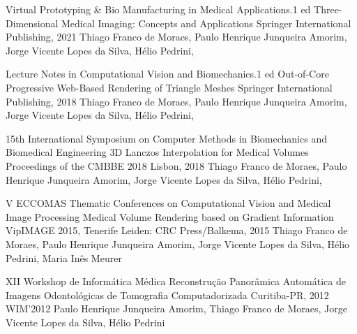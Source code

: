 \begin{cventries}
  \cventry
  {Virtual Prototyping \& Bio Manufacturing in Medical Applications.1 ed}
  {Three-Dimensional Medical Imaging: Concepts and Applications}
  {Springer International Publishing, 2021}
  {}
  {
    Thiago Franco de Moraes,
    Paulo Henrique Junqueira Amorim,
    Jorge Vicente Lopes da Silva,
    Hélio Pedrini,
  }

  \cventry
  {Lecture Notes in Computational Vision and Biomechanics.1 ed}
  {Out-of-Core Progressive Web-Based Rendering of Triangle Meshes}
  {Springer International Publishing, 2018}
  {}
  {
    Thiago Franco de Moraes,
    Paulo Henrique Junqueira Amorim,
    Jorge Vicente Lopes da Silva,
    Hélio Pedrini,
  }

  \cventry
  {15th International Symposium on Computer Methods in Biomechanics and Biomedical Engineering}
  {3D Lanczos Interpolation for Medical Volumes}
  {Proceedings of the CMBBE 2018}
  {Lisbon, 2018}
  {
    Thiago Franco de Moraes,
    Paulo Henrique Junqueira Amorim,
    Jorge Vicente Lopes da Silva,
    Hélio Pedrini,
  }

  \cventry
    {V ECCOMAS Thematic Conferences on Computational Vision and Medical Image Processing}
    {Medical Volume Rendering based on Gradient Information}
    {VipIMAGE 2015, Tenerife}
    {Leiden: CRC Press/Balkema, 2015}
    {
    Thiago Franco de Moraes,
    Paulo Henrique Junqueira Amorim,
    Jorge Vicente Lopes da Silva,
    Hélio Pedrini,
    Maria Inês Meurer
    }

   \cventry
    {XII Workshop de Informática Médica}
    {Reconstrução Panorâmica Automática de Imagens Odontológicas de Tomografia Computadorizada}
    {Curitiba-PR, 2012}
    {WIM'2012}
    {
    Paulo Henrique Junqueira Amorim,
    Thiago Franco de Moraes,
    Jorge Vicente Lopes da Silva,
    Hélio Pedrini
    }








\end{cventries}

